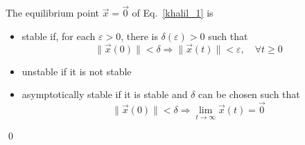 \documentclass[12pt,a4paper,oneside]{book}
\begin{document}
\begin{onehalfspace}
\begin{defn}
	The equilibrium point $\vec{x}=\vec{0}$ of Eq.~\eqref{khalil_1} is
	\begin{itemize}
		\item stable if, for each $\varepsilon>0$, there is 
		$\delta(\varepsilon)>0$ such that
		\begin{equation*}
			\|\vec{x}(0)\|<\delta\Rightarrow\|\vec{x}(t)\|<\varepsilon,\quad\forall
			 t\ge0
		\end{equation*}
		\item unstable if it is not stable
		\item asymptotically stable if it is stable and $\delta$ can be chosen 
		such that
		\begin{equation*}
			\|\vec{x}(0)\|<\delta\Rightarrow 
			\lim\limits_{t\rightarrow\infty}\vec{x}(t)=\vec{0}
		\end{equation*}
	\end{itemize}
	\qed
\end{defn} 


\end{onehalfspace}
\end{document}
